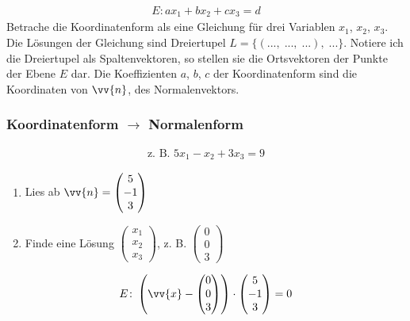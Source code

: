\begin{gather*}
  E \colon ax_1 + bx_2 + cx_3 = d
\end{gather*}
Betrache die Koordinatenform als eine Gleichung für drei Variablen $x_1$, $x_2$, $x_3$. Die Lösungen der Gleichung sind Dreiertupel $L = \{(...,\;...,\;...),\;...\}$. Notiere ich die Dreiertupel als Spaltenvektoren, so stellen sie die Ortsvektoren der Punkte der Ebene $E$ dar. Die Koeffizienten $a$, $b$, $c$ der Koordinatenform sind die Koordinaten von $\vv{n}$, des Normalenvektors.
\subsubsection{Koordinatenform $\rightarrow$ Normalenform}
\begin{gather*}
  \text{z. B. } 5x_1 - x_2 + 3x_3 = 9
\end{gather*}
\begin{enumerate}
  \item Lies ab $\vv{n} = \begin{pmatrix}5 \\ -1 \\ 3\end{pmatrix}$
  \item Finde eine Lösung $\begin{pmatrix}x_1 \\ x_2 \\ x_3\end{pmatrix}$, z. B. $\begin{pmatrix}0 \\ 0 \\ 3\end{pmatrix}$
\end{enumerate}
\begin{gather*}
  E \colon \left(\vv{x} - \begin{pmatrix}0 \\ 0 \\ 3\end{pmatrix}\right) \cdot \begin{pmatrix}5 \\ -1 \\ 3\end{pmatrix} = 0
\end{gather*}

